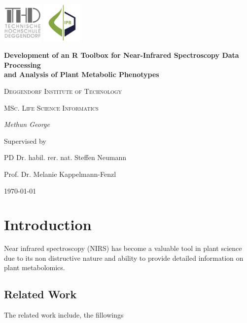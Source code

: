 \documentclass[12pt,a4paper]{report}
\begin{document}
\begin{titlepage}
    \centering
    \begin{flushright}
        \centering
        \includegraphics[width=2cm]{images/thd.png} %
        \hspace{0cm} %
        \includegraphics[width=2cm]{images/ipb.jpg} %
    \end{flushright}
    {\huge\bfseries Development of an R Toolbox for Near-Infrared Spectroscopy Data Processing \\
    and Analysis of Plant Metabolic Phenotypes\par}
    \vspace{2cm}
    {\LARGE \textsc{Deggendorf Institute of Technology}\par}
    \vspace{1cm}
    {\Large \textsc{MSc. Life Science Informatics}\par}
    \vspace{1.5cm}
    {\Large\itshape Methun George\par}
    \vfill
    Supervised by\par
    PD Dr. habil. rer. nat. Steffen Neumann\par
    Prof. Dr. Melanie Kappelmann-Fenzl
    \vfill
    {\large \today\par}
\end{titlepage}

\newpage
\tableofcontents
\newpage


\chapter{Introduction}
Near infrared spectroscopy (NIRS) has become a valuable tool in plant science due to its non distructive nature
and ability to provide detailed information on plant metabolomics.
\section{Related Work}
The related work include, the fillowings
\end{document}
